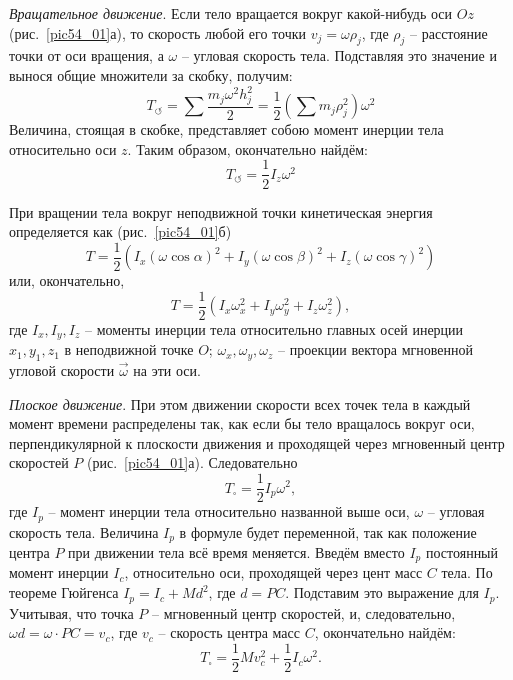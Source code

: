 \emph{Вращательное движение}. Если тело вращается вокруг какой-нибудь 
оси \( Oz \) (рис.~\ref{pic54_01}а), то скорость любой его точки 
\( v_j = \omega \rho_j \), где \( \rho_j \) -- расстояние точки от оси вращения, 
а \( \omega \) -- угловая скорость тела. Подставляя это значение и вынося 
общие множители за скобку, получим:
\[ 
	T_{\circlearrowleft} = \sum\frac{m_j \omega^2 h^2_j}{2} = 
	\frac{1}{2}\left( \sum m_j \rho^2_j \right)\omega^2
\]
Величина, стоящая в скобке, представляет собою момент инерции тела 
относительно оси \( z \). Таким образом, окончательно найдём:
\[ T_{\circlearrowleft} = \frac{1}{2}I_z \omega^2 \]

При вращении тела вокруг неподвижной точки кинетическая энергия 
определяется как (рис.~\ref{pic54_01}б)
\[ 
	T = \frac{1}{2}\left( I_x(\omega\cos\alpha)^2 + 
	I_y(\omega\cos\beta)^2 + I_z(\omega\cos\gamma)^2 \right)
\]
или, окончательно, 
\[ 
	T = \frac{1}{2}\left( I_x\omega^2_x + I_y\omega^2_y + I_z\omega^2_z \right), 
\]
где \( I_x, I_y, I_z \) -- моменты инерции тела относительно главных 
осей инерции \( x_1, y_1, z_1 \) в неподвижной точке \( O \); 
\( \omega_x, \omega_y, \omega_z \) -- проекции вектора мгновенной 
угловой скорости \( \vec{\omega} \) на эти оси.

\emph{Плоское движение}. При этом движении скорости всех точек тела в 
каждый момент времени распределены так, как если бы тело вращалось 
вокруг оси, перпендикулярной к плоскости движения и проходящей через 
мгновенный центр скоростей \( P \) (рис.~\ref{pic54_01}а). Следовательно 
\[
	T_\square = \frac{1}{2}I_p \omega^2,
\]
где \( I_p \) -- момент инерции тела относительно названной выше оси, 
\( \omega \) -- угловая скорость тела. Величина \( I_p \) в формуле 
будет переменной, так как положение центра \( P \) при движении тела 
всё время меняется. Введём вместо \( I_p \) постоянный момент инерции 
\( I_c \), относительно оси, проходящей через цент масс \( C \) 
тела. По теореме Гюйгенса \( I_p = I_c + Md^2 \), где \( d = PC \). 
Подставим это выражение для \( I_p \). Учитывая, что точка \( P \) -- 
мгновенный центр скоростей, и, следовательно, 
\( \omega d = \omega\cdot PC = v_c \), где \( v_c \) -- скорость 
центра масс \( C \), окончательно найдём:
\[ 
	T_\square = \frac{1}{2}Mv^2_c + 
	\frac{1}{2}I_c \omega^2.
\]

\newpage
